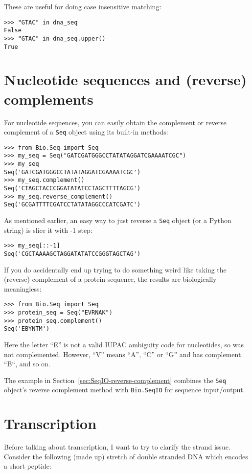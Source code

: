 These are useful for doing case insensitive matching:

\begin{verbatim}
>>> "GTAC" in dna_seq
False
>>> "GTAC" in dna_seq.upper()
True
\end{verbatim}

\section{Nucleotide sequences and (reverse) complements}
\label{sec:seq-reverse-complement}

For nucleotide sequences, you can easily obtain the complement or reverse
complement of a \verb|Seq| object using its built-in methods:

\begin{verbatim}
>>> from Bio.Seq import Seq
>>> my_seq = Seq("GATCGATGGGCCTATATAGGATCGAAAATCGC")
>>> my_seq
Seq('GATCGATGGGCCTATATAGGATCGAAAATCGC')
>>> my_seq.complement()
Seq('CTAGCTACCCGGATATATCCTAGCTTTTAGCG')
>>> my_seq.reverse_complement()
Seq('GCGATTTTCGATCCTATATAGGCCCATCGATC')
\end{verbatim}

As mentioned earlier, an easy way to just reverse a \verb|Seq| object (or a
Python string) is slice it with -1 step:

\begin{verbatim}
>>> my_seq[::-1]
Seq('CGCTAAAAGCTAGGATATATCCGGGTAGCTAG')
\end{verbatim}

If you do accidentally end up trying to do something weird like taking the
(reverse) complement of a protein sequence, the results are biologically
meaningless:

\begin{verbatim}
>>> from Bio.Seq import Seq
>>> protein_seq = Seq("EVRNAK")
>>> protein_seq.complement()
Seq('EBYNTM')
\end{verbatim}

Here the letter ``E'' is not a valid IUPAC ambiguity code for nucleotides,
so was not complemented. However, ``V'' means ``A'', ``C'' or ``G'' and
has complement ``B``, and so on.

The example in Section~\ref{sec:SeqIO-reverse-complement} combines the \verb|Seq|
object's reverse complement method with \verb|Bio.SeqIO| for sequence input/output.

\section{Transcription}
Before talking about transcription, I want to try to clarify the strand issue.
Consider the following (made up) stretch of double stranded DNA which
encodes a short peptide:

